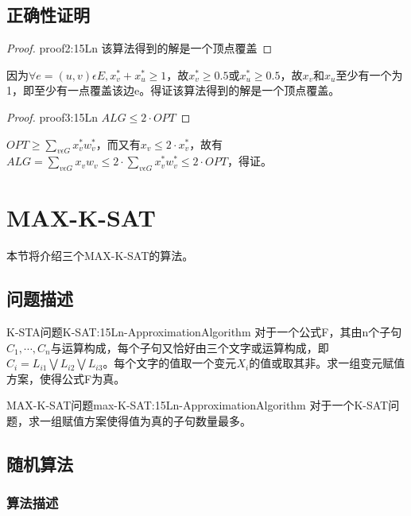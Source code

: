 \subsection{正确性证明}

\begin{proof}{}{proof2:15Ln}
	该算法得到的解是一个顶点覆盖
\end{proof}
	因为$\forall e=(u,v)\epsilon E,x_v^*+x_u^*\geqslant 1$，故$x_v^*\geqslant 0.5$或$x_u^*\geqslant 0.5$，故$x_v$和$x_u$至少有一个为1，即至少有一点覆盖该边e。得证该算法得到的解是一个顶点覆盖。
\begin{proof}{}{proof3:15Ln}
	$ALG\leqslant 2\cdot OPT$
\end{proof}
	$OPT\geqslant \sum\limits_{v\epsilon G} x_v^*w_v^*$，而又有$x_v\leqslant 2\cdot x_v^*$，故有
	$ALG=\sum\limits_{v\epsilon G} x_vw_v\leqslant 2\cdot \sum\limits_{v\epsilon G} x_v^*w_v^*\leqslant 2\cdot OPT$，得证。

\section{MAX-K-SAT}

本节将介绍三个MAX-K-SAT的算法。

\subsection{问题描述}

\begin{definition}{K-STA问题}{K-SAT:15Ln-ApproximationAlgorithm}
	对于一个公式F，其由n个子句${C_1,\cdots ,C_n}$与运算构成，每个子句又恰好由三个文字或运算构成，即$C_i=L_{i1}\bigvee L_{i2}\bigvee L_{i3}$。每个文字的值取一个变元$X_i$的值或取其非。求一组变元赋值方案，使得公式F为真。
\end{definition}

\begin{definition}{MAX-K-SAT问题}{max-K-SAT:15Ln-ApproximationAlgorithm}
	对于一个K-SAT问题，求一组赋值方案使得值为真的子句数量最多。
\end{definition}

\subsection{随机算法}

\subsubsection{算法描述}

